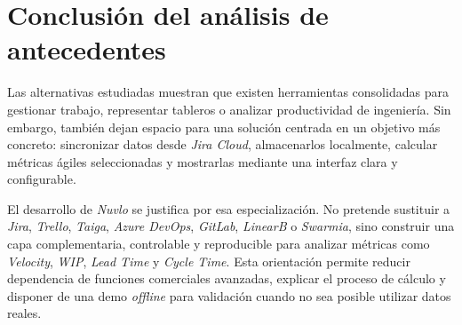 \section{Conclusión del análisis de antecedentes}

Las alternativas estudiadas muestran que existen herramientas consolidadas para gestionar trabajo, representar tableros o analizar productividad de ingeniería. Sin embargo, también dejan espacio para una solución centrada en un objetivo más concreto: sincronizar datos desde \textit{Jira Cloud}, almacenarlos localmente, calcular métricas ágiles seleccionadas y mostrarlas mediante una interfaz clara y configurable.

El desarrollo de \textit{Nuvlo} se justifica por esa especialización. No pretende sustituir a \textit{Jira}, \textit{Trello}, \textit{Taiga}, \textit{Azure DevOps}, \textit{GitLab}, \textit{LinearB} o \textit{Swarmia}, sino construir una capa complementaria, controlable y reproducible para analizar métricas como \textit{Velocity}, \textit{WIP}, \textit{Lead Time} y \textit{Cycle Time}. Esta orientación permite reducir dependencia de funciones comerciales avanzadas, explicar el proceso de cálculo y disponer de una demo \textit{offline} para validación cuando no sea posible utilizar datos reales.
